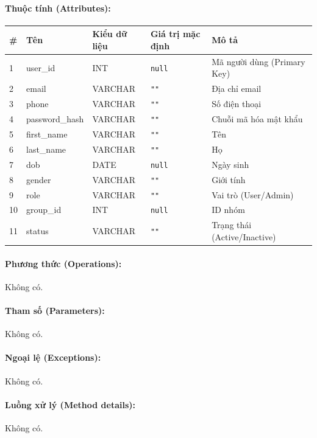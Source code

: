 \documentclass[12pt,a4paper]{article}
\begin{document}
\paragraph{Thuộc tính (Attributes):}
\begin{longtable}{|p{0.6cm}|p{3.5cm}|p{2.4cm}|p{1.8cm}|p{5.1cm}|}
\hline
\textbf{\#} & \textbf{Tên} & \textbf{Kiểu dữ liệu} & \textbf{Giá trị mặc định} & \textbf{Mô tả} \\ \hline
\endhead
1 & user\_id & INT & \texttt{null} & Mã người dùng (Primary Key) \\ \hline
2 & email & VARCHAR & \texttt{""} & Địa chỉ email \\ \hline
3 & phone & VARCHAR & \texttt{""} & Số điện thoại \\ \hline
4 & password\_hash & VARCHAR & \texttt{""} & Chuỗi mã hóa mật khẩu \\ \hline
5 & first\_name & VARCHAR & \texttt{""} & Tên \\ \hline
6 & last\_name & VARCHAR & \texttt{""} & Họ \\ \hline
7 & dob & DATE & \texttt{null} & Ngày sinh \\ \hline
8 & gender & VARCHAR & \texttt{""} & Giới tính \\ \hline
9 & role & VARCHAR & \texttt{""} & Vai trò (User/Admin) \\ \hline
10 & group\_id & INT & \texttt{null} & ID nhóm \\ \hline
11 & status & VARCHAR & \texttt{""} & Trạng thái (Active/Inactive) \\ \hline
\end{longtable}

\paragraph{Phương thức (Operations):}
Không có.

\paragraph{Tham số (Parameters):}
Không có.

\paragraph{Ngoại lệ (Exceptions):}
Không có.

\paragraph{Luồng xử lý (Method details):}
Không có.
\end{document}

